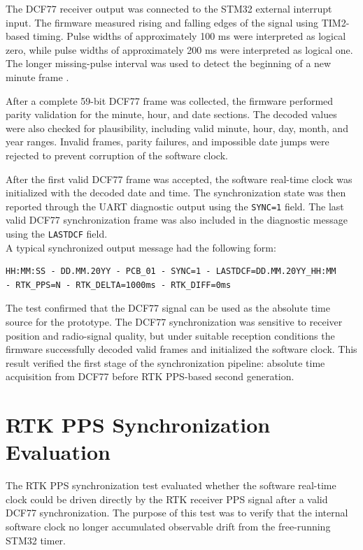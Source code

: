 The DCF77 receiver output was connected to the STM32 external interrupt input. The firmware measured rising and falling edges of the signal using TIM2-based timing. Pulse widths of approximately 100 ms were interpreted as logical zero, while pulse widths of approximately 200 ms were interpreted as logical one. The longer missing-pulse interval was used to detect the beginning of a new minute frame \cite{ptbDcf77}.

After a complete 59-bit DCF77 frame was collected, the firmware performed parity validation for the minute, hour, and date sections. The decoded values were also checked for plausibility, including valid minute, hour, day, month, and year ranges. Invalid frames, parity failures, and impossible date jumps were rejected to prevent corruption of the software clock.

After the first valid DCF77 frame was accepted, the software real-time clock was initialized with the decoded date and time. The synchronization state was then reported through the UART diagnostic output using the \texttt{SYNC=1} field. The last valid DCF77 synchronization frame was also included in the diagnostic message using the \texttt{LASTDCF} field.
\\
A typical synchronized output message had the following form:
\begin{verbatim}
HH:MM:SS - DD.MM.20YY - PCB_01 - SYNC=1 - LASTDCF=DD.MM.20YY_HH:MM
- RTK_PPS=N - RTK_DELTA=1000ms - RTK_DIFF=0ms
\end{verbatim}
The test confirmed that the DCF77 signal can be used as the absolute time source for the prototype. The DCF77 synchronization was sensitive to receiver position and radio-signal quality, but under suitable reception conditions the firmware successfully decoded valid frames and initialized the software clock. This result verified the first stage of the synchronization pipeline: absolute time acquisition from DCF77 before RTK PPS-based second generation.

\section{RTK PPS Synchronization Evaluation}

The RTK PPS synchronization test evaluated whether the software real-time clock could be driven directly by the RTK receiver PPS signal after a valid DCF77 synchronization. The purpose of this test was to verify that the internal software clock no longer accumulated observable drift from the free-running STM32 timer.

